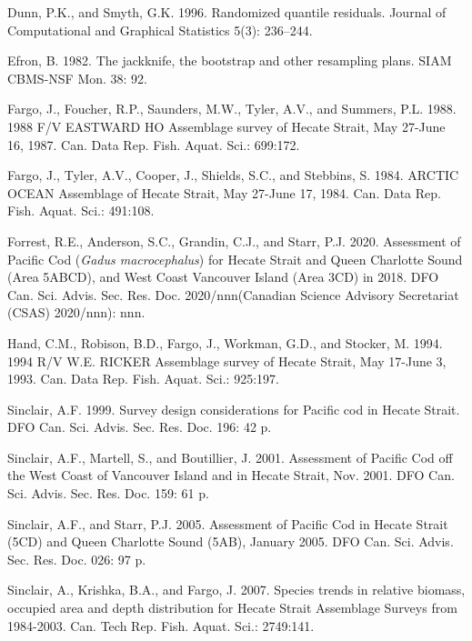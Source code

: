 \documentclass[11pt]{book}
\begin{document}
\leavevmode\hypertarget{ref-dunn1996}{}%
Dunn, P.K., and Smyth, G.K. 1996. Randomized quantile residuals. Journal of Computational and Graphical Statistics 5(3): 236--244.

\leavevmode\hypertarget{ref-efron1982}{}%
Efron, B. 1982. The jackknife, the bootstrap and other resampling plans. SIAM CBMS-NSF Mon. 38: 92.

\leavevmode\hypertarget{ref-fargo1988}{}%
Fargo, J., Foucher, R.P., Saunders, M.W., Tyler, A.V., and Summers, P.L. 1988. 1988 F/V EASTWARD HO Assemblage survey of Hecate Strait, May 27-June 16, 1987. Can. Data Rep. Fish. Aquat. Sci.: 699:172.

\leavevmode\hypertarget{ref-fargo1984}{}%
Fargo, J., Tyler, A.V., Cooper, J., Shields, S.C., and Stebbins, S. 1984. ARCTIC OCEAN Assemblage of Hecate Strait, May 27-June 17, 1984. Can. Data Rep. Fish. Aquat. Sci.: 491:108.

\leavevmode\hypertarget{ref-forrest2020}{}%
Forrest, R.E., Anderson, S.C., Grandin, C.J., and Starr, P.J. 2020. Assessment of Pacific Cod (\emph{Gadus macrocephalus}) for Hecate Strait and Queen Charlotte Sound (Area 5ABCD), and West Coast Vancouver Island (Area 3CD) in 2018. DFO Can. Sci. Advis. Sec. Res. Doc. 2020/nnn(Canadian Science Advisory Secretariat (CSAS) 2020/nnn): nnn.

\leavevmode\hypertarget{ref-hand1994}{}%
Hand, C.M., Robison, B.D., Fargo, J., Workman, G.D., and Stocker, M. 1994. 1994 R/V W.E. RICKER Assemblage survey of Hecate Strait, May 17-June 3, 1993. Can. Data Rep. Fish. Aquat. Sci.: 925:197.

\leavevmode\hypertarget{ref-sinclair2000}{}%
Sinclair, A.F. 1999. Survey design considerations for Pacific cod in Hecate Strait. DFO Can. Sci. Advis. Sec. Res. Doc. 196: 42 p.

\leavevmode\hypertarget{ref-sinclair2001}{}%
Sinclair, A.F., Martell, S., and Boutillier, J. 2001. Assessment of Pacific Cod off the West Coast of Vancouver Island and in Hecate Strait, Nov. 2001. DFO Can. Sci. Advis. Sec. Res. Doc. 159: 61 p.

\leavevmode\hypertarget{ref-sinclair2005}{}%
Sinclair, A.F., and Starr, P.J. 2005. Assessment of Pacific Cod in Hecate Strait (5CD) and Queen Charlotte Sound (5AB), January 2005. DFO Can. Sci. Advis. Sec. Res. Doc. 026: 97 p.

\leavevmode\hypertarget{ref-sinclair2007}{}%
Sinclair, A., Krishka, B.A., and Fargo, J. 2007. Species trends in relative biomass, occupied area and depth distribution for Hecate Strait Assemblage Surveys from 1984-2003. Can. Tech Rep. Fish. Aquat. Sci.: 2749:141.
\end{document}
